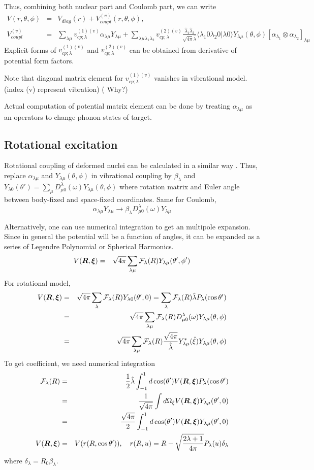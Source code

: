 \documentclass[11pt]{book}
\def\bm{\boldsymbol}
\def\vR{{\bm R}}
\def\la{\langle}
\def\ra{\rangle}
\newcommand{\bea}{\begin{eqnarray}}
\newcommand{\eea}{\end{eqnarray}}
\newcommand{\no}{\nonumber \\}
\begin{document}
Thus, combining both nuclear part and Coulomb part, we can write
\bea 
V(r,\theta,\phi)&=& V_{diag}(r)+V_{coupl}^{(v)}(r,\theta,\phi),\no 
V_{coupl}^{(v)}&=& \sum_{\lambda\mu} 
     v_{cp;\lambda}^{(1)(v)}\alpha_{\lambda\mu} Y_{\lambda\mu}
 +\sum_{\lambda\mu\lambda_1\lambda_2}
      v_{cp;\lambda}^{(2)(v)} \frac{\hat{\lambda}_1\hat{\lambda}_2}{\sqrt{4\pi} \hat{\lambda}} \la \lambda_1 0 \lambda_2 0|\lambda 0\ra 
                Y_{\lambda\mu}(\theta,\phi) 
                [\alpha_{\lambda_1}\otimes \alpha_{\lambda_2}]_{\lambda\mu}
\eea 
Explicit forms of $v_{cp;\lambda}^{(1)(v)}$ and $v_{cp;\lambda}^{(2)(v)}$
can be obtained from derivative of potential form factors. 

Note that diagonal matrix element for $v_{cp;\lambda}^{(1)(v)}$ vanishes
in vibrational model.  (index (v) represent vibration) ({\color{red} Why?})

Actual computation of potential matrix element can be done by treating 
$\alpha_{\lambda\mu}$ as an operators to change phonon states of target. 

\subsection{Rotational excitation}



Rotational coupling of deformed nuclei can be calculated in a similar way .
Thus, replace $\alpha_{\lambda\mu}$ and $Y_{\lambda\mu}(\theta,\phi)$ in 
vibrational coupling by $\beta_{\lambda}$ and 
$Y_{\lambda 0}(\theta')=\sum_{\mu} D^\lambda_{\mu 0}(\omega) Y_{\lambda\mu}(\theta,\phi) $ 
where rotation matrix and Euler angle between body-fixed and space-fixed coordinates.
Same for Coulomb, 
$$\alpha_{\lambda\mu} Y_{\lambda\mu}\to 
\beta_{\lambda} D^\lambda_{\mu 0}(\omega) Y_{\lambda\mu}$$

Alternatively, one can use numerical integration to get an multipole expansion. 
Since in general the potential will be a function of angles, 
it can be expanded as a series of Legendre Polynomial or Spherical Harmonics.
\bea 
V(\vR,{\bm\xi})&=&\sqrt{4\pi} \sum_{\lambda\mu} {\cal F}_\lambda(R) Y_{\lambda\mu}(\theta',\phi')
\eea 
For rotational model, 
\bea 
V(\vR,{\bm\xi})&=&\sqrt{4\pi} \sum_{\lambda} {\cal F}_\lambda(R) 
               Y_{\lambda0}(\theta',0)
               =\sum_{\lambda} {\cal F}_\lambda(R)\hat{\lambda}P_\lambda(\cos\theta')\no
              &=& \sqrt{4\pi} \sum_{\lambda\mu} {\cal F}_\lambda(R) 
               D^\lambda_{\mu 0}(\omega) Y_{\lambda\mu}(\theta,\phi) \no 
 &=&  \sqrt{4\pi} \sum_{\lambda\mu} {\cal F}_\lambda(R)
               \frac{\sqrt{4\pi}}{\hat{\lambda}}
               Y_{\lambda\mu}^*(\hat{\xi}) Y_{\lambda\mu}(\theta,\phi)           
\eea 
To get coefficient, we need numerical integration
\bea 
{\cal F}_\lambda(R)&=&\frac{1}{2}\hat{\lambda}
   \int_{-1}^1 d\cos(\theta') V({\bm R},{\bm \xi}) P_\lambda(\cos\theta')\no 
   &=&\frac{1}{\sqrt{4\pi}}\int d\Omega_{\xi}  V({\bm R},{\bm \xi}) Y_{\lambda \mu}(\theta',0)\no 
   &=&\frac{\sqrt{4\pi}}{2}\int_{-1}^1 d\cos(\theta') V({\bm R},{\bm \xi}) Y_{\lambda\mu}(\theta',0) \no 
V({\bm R},{\bm \xi})&=& V(r(R,\cos\theta')),\quad 
     r(R,u)= R-\sqrt{\frac{2\lambda+1}{4\pi}} P_\lambda(u)\delta_\lambda 
\eea 
where $\delta_\lambda=R_0\beta_{\lambda}$. 
\end{document}
